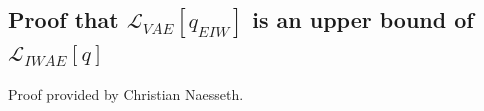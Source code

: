 \documentclass{article} %
\begin{document}













\subsection{Proof that \texorpdfstring{$\mathcal{L}_{VAE}[q_{EIW}]$}{} is an upper bound of \texorpdfstring{$\mathcal{L}_{IWAE}[q]$}{}}


Proof provided by Christian Naesseth.

\end{document}
